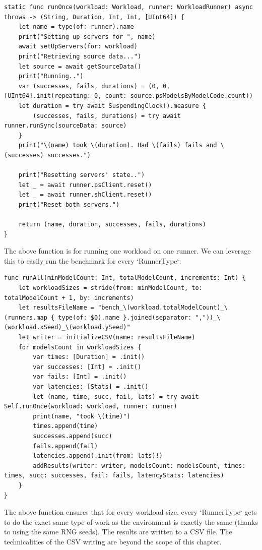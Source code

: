 \begin{verbatim}
static func runOnce(workload: Workload, runner: WorkloadRunner) async throws -> (String, Duration, Int, Int, [UInt64]) {
    let name = type(of: runner).name
    print("Setting up servers for ", name)
    await setUpServers(for: workload)
    print("Retrieving source data...")
    let source = await getSourceData()
    print("Running..")
    var (successes, fails, durations) = (0, 0, [UInt64].init(repeating: 0, count: source.psModelsByModelCode.count))
    let duration = try await SuspendingClock().measure {
        (successes, fails, durations) = try await runner.runSync(sourceData: source)
    }
    print("\(name) took \(duration). Had \(fails) fails and \(successes) successes.")
    
    print("Resetting servers' state..")
    let _ = await runner.psClient.reset()
    let _ = await runner.shClient.reset()
    print("Reset both servers.")
    
    return (name, duration, successes, fails, durations)
}
\end{verbatim}

The above function is for running one workload on one runner. We can leverage this to easily run the benchmark for every `RunnerType`:

\begin{verbatim}
func runAll(minModelCount: Int, totalModelCount, increments: Int) {
    let workloadSizes = stride(from: minModelCount, to: totalModelCount + 1, by: increments)
    let resultsFileName = "bench_\(workload.totalModelCount)_\(runners.map { type(of: $0).name }.joined(separator: ","))_\(workload.xSeed)_\(workload.ySeed)"
    let writer = initializeCSV(name: resultsFileName)
    for modelsCount in workloadSizes {
        var times: [Duration] = .init()
        var successes: [Int] = .init()
        var fails: [Int] = .init()
        var latencies: [Stats] = .init()
        let (name, time, succ, fail, lats) = try await Self.runOnce(workload: workload, runner: runner)
        print(name, "took \(time)")
        times.append(time)
        successes.append(succ)
        fails.append(fail)
        latencies.append(.init(from: lats)!)
        addResults(writer: writer, modelsCount: modelsCount, times: times, succ: successes, fail: fails, latencyStats: latencies)
    }
}
\end{verbatim}

The above function ensures that for every workload size, every `RunnerType` gets to do the exact same type of work as the environment is exactly the same (thanks to using the same RNG seeds). The results are written to a CSV file. The technicalities of the CSV writing are beyond the scope of this chapter.


